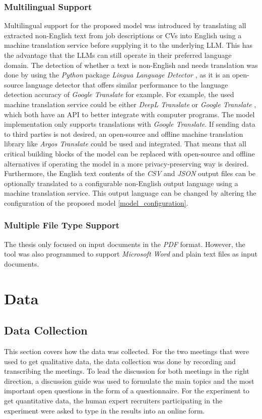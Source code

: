\documentclass[draft,final]{thesisclass} %
\begin{document}
\subsection{Multilingual Support}
Multilingual support for the proposed model was introduced by translating all extracted non-English text from job descriptions or \acs{CV}s into English using a machine translation service before supplying it to the underlying \acs{LLM}.
This has the advantage that the \acs{LLM}s can still operate in their preferred language domain.
The detection of whether a text is non-English and needs translation was done by using the \textit{Python} package \textit{Lingua Language Detector} \parencite{lingua_language_detector}, as it is an open-source language detector that offers similar performance to the language detection accuracy of \textit{Google Translate} for example.
For example, the used machine translation service could be either \textit{DeepL Translate} \parencite{deepl_translate} or \textit{Google Translate} \parencite{google_translate}, which both have an API to better integrate with computer programs.
The model implementation only supports translations with \textit{Google Translate}.
If sending data to third parties is not desired, an open-source and offline machine translation library like \textit{Argos Translate} \parencite{argos_translate} could be used and integrated.
That means that all critical building blocks of the model can be replaced with open-source and offline alternatives if operating the model in a more privacy-preserving way is desired.
Furthermore, the English text contents of the \textit{CSV} and \textit{JSON} output files can be optionally translated to a configurable non-English output language using a machine translation service.
This output language can be changed by altering the configuration of the proposed model \ref{model_configuration}.

\subsection{Multiple File Type Support}
The thesis only focused on input documents in the \textit{PDF} format.
However, the tool was also programmed to support \textit{Microsoft Word} and plain text files as input documents.

\chapter{Data} \label{data}

\section{Data Collection}
This section covers how the data was collected.
For the two meetings that were used to get qualitative data, the data collection was done by recording and transcribing the meetings.
To lead the discussion for both meetings in the right direction, a discussion guide was used to formulate the main topics and the most important open questions in the form of a questionnaire.
For the experiment to get quantitative data, the human expert recruiters participating in the experiment were asked to type in the results into an online form.
\end{document}
